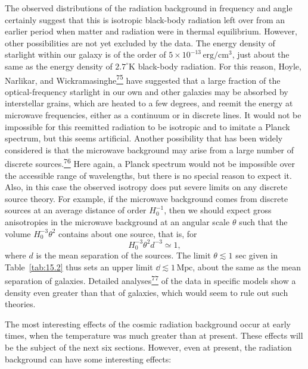 The observed distributions of the radiation background in frequency and angle
certainly suggest that this is isotropic black-body radiation left over from an
earlier period when matter and radiation were in thermal equilibrium. However,
other possibilities are not yet excluded by the data. The energy density of
starlight within our galaxy is of the order of
\(5\times10^{-13}\,\mathrm{erg/cm^3}\), just about the same as the energy
density of \(2.7^\circ\mathrm{K}\) black-body radiation. For this reason,
Hoyle, Narlikar, and
Wickramasinghe\hyperref[ch15-ref-75]{\textsuperscript{75}} have suggested
that a large fraction of the optical-frequency starlight in our own and other
galaxies may be absorbed by interstellar grains, which are heated to a few
degrees, and reemit the energy at microwave frequencies, either as a continuum
or in discrete lines. It would not be impossible for this reemitted radiation
to be isotropic and to imitate a Planck spectrum, but this seems artificial.
Another possibility that has been widely considered is that the microwave
background may arise from a large number of discrete
sources.\hyperref[ch15-ref-76]{\textsuperscript{76}} Here again, a Planck
spectrum would not be impossible over the accessible range of wavelengths, but
there is no special reason to expect it. Also, in this case the observed
isotropy does put severe limits on any discrete source theory. For example, if
the microwave background comes from discrete sources at an average distance of
order \(H_0^{-1}\), then we should expect gross anisotropies in the microwave
background at an angular scale \(\theta\) such that the volume
\(H_0^{-3}\theta^2\) contains about one source, that is, for
\begin{equation}
  H_0^{-3}\theta^2d^{-3}\simeq1,
  \tag{15.5.40}\label{eq:15.5.40}
\end{equation}
where \(d\) is the mean separation of the sources. The limit
\(\theta\lesssim1\) sec given in Table~\ref{tab:15.2} thus sets an upper
limit \(\dd\lesssim1\,\mathrm{Mpc}\), about the same as the mean separation of
galaxies. Detailed analyses\hyperref[ch15-ref-77]{\textsuperscript{77}} of the
data in specific models show a density even greater than that of galaxies,
which would seem to rule out such theories.

The most interesting effects of the cosmic radiation background occur at early
times, when the temperature was much greater than at present. These effects
will be the subject of the next six sections. However, even at present, the
radiation background can have some interesting effects:

